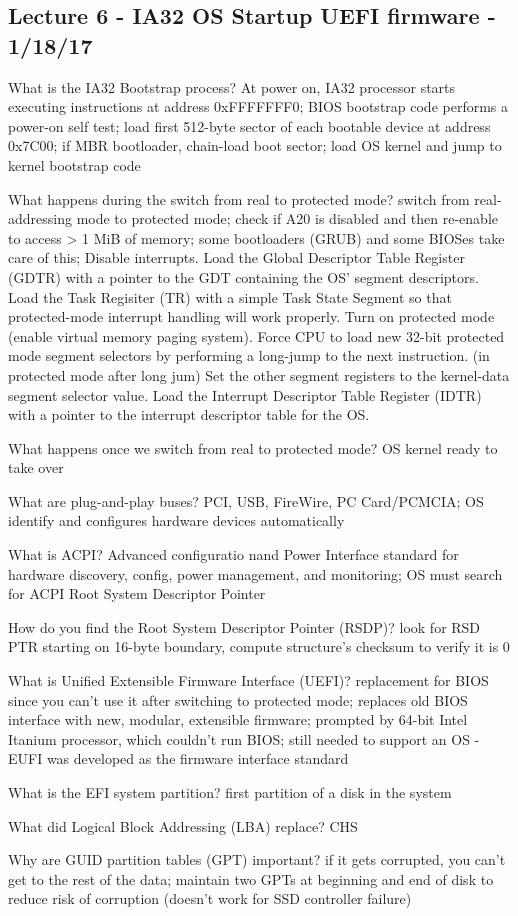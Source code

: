 \documentclass[10pt]{article}
\begin{document}
\begin{description}
\section{Lecture 6 - IA32 OS Startup UEFI firmware - 1/18/17}
\end{description}
\item[What is the IA32 Bootstrap process?]
  At power on, IA32 processor starts executing instructions at address 0xFFFFFFF0;
  BIOS bootstrap code performs a power-on self test;
  load first 512-byte sector of each bootable device at address 0x7C00;
  if MBR bootloader, chain-load boot sector;
  load OS kernel and jump to kernel bootstrap code
\item[What happens during the switch from real to protected mode?]
  switch from real-addressing mode to protected mode;
  check if A20 is disabled and then re-enable to access > 1 MiB of memory;
  some bootloaders (GRUB) and some BIOSes take care of this;
  Disable interrupts.
  Load the Global Descriptor Table Register (GDTR) with a pointer to the GDT containing the OS' segment descriptors.
  Load the Task Regisiter (TR) with a simple Task State Segment so that protected-mode interrupt handling will work properly.
  Turn on protected mode (enable virtual memory paging system).
  Force CPU to load new 32-bit protected mode segment selectors by performing a long-jump to the next instruction. (in protected mode after long jum)
  Set the other segment registers to the kernel-data segment selector value.
  Load the Interrupt Descriptor Table Register (IDTR) with a pointer to the interrupt descriptor table for the OS.
\item[What happens once we switch from real to protected mode?]
  OS kernel ready to take over
\item[What are plug-and-play buses?]
  PCI, USB, FireWire, PC Card/PCMCIA; OS identify and configures hardware devices automatically
\item[What is ACPI?]
  Advanced configuratio nand Power Interface standard for hardware discovery, config, power management, and monitoring;
  OS must search for ACPI Root System Descriptor Pointer
\item[How do you find the Root System Descriptor Pointer (RSDP)?]
  look for RSD PTR starting on 16-byte boundary, compute structure's checksum to verify it is 0
\item[What is Unified Extensible Firmware Interface (UEFI)?]
  replacement for BIOS since you can't use it after switching to protected mode;
  replaces old BIOS interface with new, modular, extensible firmware;
  prompted by 64-bit Intel Itanium processor, which couldn't run BIOS;
  still needed to support an OS - EUFI was developed as the firmware interface standard
\item[What is the EFI system partition?]
  first partition of a disk in the system
\item[What did Logical Block Addressing (LBA) replace?]
  CHS
\item[Why are GUID partition tables (GPT) important?]
  if it gets corrupted, you can't get to the rest of the data;
  maintain two GPTs at beginning and end of disk to reduce risk of corruption (doesn't work for SSD controller failure)
\end{document}
